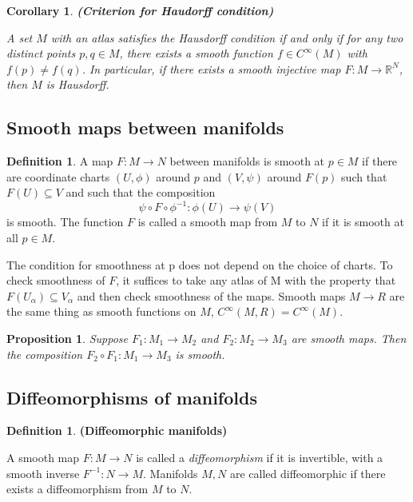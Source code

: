 \documentclass{article}
\newtheorem{corollary}{Corollary}[theorem]
\newtheorem{proposition}{Proposition}[theorem]
\theoremstyle{definition}
\newtheorem{defn}[theorem]{Definition}
\newenvironment{definition}
  {\vspace{8pt}\begin{mdframed}[backgroundcolor=blueish,innertopmargin=4]\begin{defn}}
  {\end{defn}\end{mdframed}\vspace{4pt}}
\begin{document}
\begin{corollary} \textbf{(Criterion for Haudorff condition)}


A set $M$ with an atlas satisfies the Hausdorff condition if and only if for any two distinct points $p,q \in M$, there exists a smooth function $f \in C^\infty(M)$ with $f(p) \neq f(q)$. In particular, if there exists a smooth injective map $F : M \rightarrow \mathbb R^N$, then $M$ is Hausdorff.
\end{corollary}

\subsection{Smooth maps between manifolds}
\begin{definition} 

A map $F : M \rightarrow N$ between manifolds is smooth at $p \in M$ if there are coordinate charts $(U,\phi)$ around $p$ and $(V,\psi)$ around $F(p)$ such that $F(U) \subseteq V$ and such that the composition
\[
    \psi \circ F \circ \phi^{-1}: \phi(U) \rightarrow \psi(V)
\]
is smooth. The function $F$ is called a smooth map from $M$ to $N$ if it is smooth at all $p \in M$.

\end{definition}

The condition for smoothness at p does not depend on the choice
of charts. To check smoothness of $F$, it suffices to take any atlas of M with the property that $F(U_\alpha) \subseteq V_\alpha$ and then check smoothness of the maps. Smooth maps $M \rightarrow R$ are the same thing as smooth functions on $M$, $C^{\infty} (M,R) = C^{\infty}(M)$.

\begin{proposition}
Suppose $F_1 : M_1 \rightarrow M_2$ and $F_2 : M_2 \rightarrow M_3$ are smooth maps. Then the composition $ F_2 \circ F_1 : M_1 \rightarrow M_3$ is smooth.
\end{proposition}

\subsection{Diffeomorphisms of manifolds}

\begin{definition} \textbf{(Diffeomorphic manifolds)}

A smooth map $F : M \rightarrow N$ is called a \textit{diffeomorphism} if it is invertible, with a smooth inverse $F^{-1} : N \rightarrow M$. Manifolds $M,N$ are called diffeomorphic if there exists a diffeomorphism from $M$ to $N$.
\end{definition}
\end{document}
